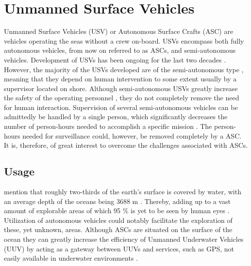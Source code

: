 \chapter{Unmanned Surface Vehicles} %

\label{Unmanned_Surface_Vehicles} %


Unmanned Surface Vehicles (USV) or Autonomous Surface Crafts (ASC) are vehicles operating the seas without a crew on-board.
USVs encompass both fully autonomous vehicles, from now on referred to as ASCs, and semi-autonomous vehicles.
Development of USVs has been ongoing for the last two decades \cite{manley2008unmanned}.
However, the majority of the USVs developed are of the semi-autonomous type \cite{liu2016unmanned,park2017development}, meaning that they depend on human intervention to some extent usually by a supervisor located on shore.
Although semi-autonomous USVs greatly increase the safety of the operating personnel \cite{liu2016unmanned}, they do not completely remove the need for human interaction.
Supervision of several semi-autonomous vehicles can be admittedly be handled by a single person, which significantly decreases the number of person-hours needed to accomplish a specific mission \cite{manley2008unmanned}.
The person-hours needed for surveillance could, however, be removed completely by a ASC.
It is, therefore, of great interest to overcome the challenges associated with ASCs.


\section{Usage}
\textcite{Yuh2011} mention that roughly two-thirds of the earth's surface is covered by water, with an average depth of the oceans being 3688 m \cite{depth_ocean}.
Thereby, adding up to a vast amount of explorable areas of which 95 \% is yet to be seen by human eyes \cite{explored_percentage}. Utilization of autonomous vehicles could notably facilitate the  exploration of these, yet unknown, areas.
Although ASCs are situated on the surface of the ocean they can greatly increase the efficiency of Unmanned Underwater Vehicles (UUV) by acting as a gateway between UUVs and services, such as GPS, not easily available in underwater environments \cite{liu2016unmanned}.

